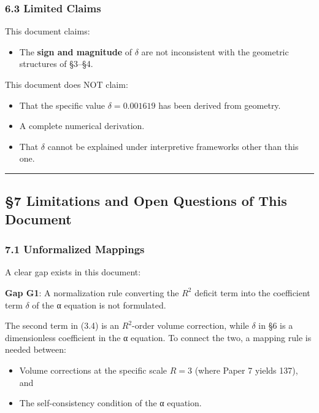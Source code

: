 \documentclass[
]{article}
\providecommand{\tightlist}{%
  \setlength{\itemsep}{0pt}\setlength{\parskip}{0pt}}
\begin{document}
\subsubsection{6.3 Limited Claims}\label{limited-claims}

This document claims:

\begin{itemize}
\tightlist
\item
  The \textbf{sign and magnitude} of \(\delta\) are not inconsistent
  with the geometric structures of §3--§4.
\end{itemize}

This document does NOT claim:

\begin{itemize}
\tightlist
\item
  That the specific value \(\delta = 0.001619\) has been derived from
  geometry.
\item
  A complete numerical derivation.
\item
  That \(\delta\) cannot be explained under interpretive frameworks
  other than this one.
\end{itemize}

\begin{center}\rule{0.5\linewidth}{0.5pt}\end{center}

\subsection{§7 Limitations and Open Questions of This
Document}\label{limitations-and-open-questions-of-this-document}

\subsubsection{7.1 Unformalized Mappings}\label{unformalized-mappings}

A clear gap exists in this document:

\textbf{Gap G1}: A normalization rule converting the \(R^2\) deficit
term into the coefficient term \(\delta\) of the α equation is not
formulated.

The second term in (3.4) is an \(R^2\)-order volume correction, while
\(\delta\) in §6 is a dimensionless coefficient in the α equation. To
connect the two, a mapping rule is needed between:

\begin{itemize}
\tightlist
\item
  Volume corrections at the specific scale \(R = 3\) (where Paper 7
  yields 137), and
\item
  The self-consistency condition of the α equation.
\end{itemize}
\end{document}
